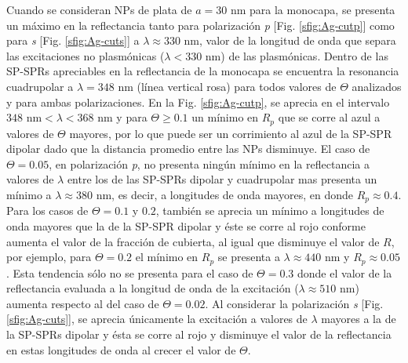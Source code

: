 Cuando se consideran NPs de plata de $a=30$ nm para la monocapa, se presenta un máximo en la reflectancia tanto para polarización \emph{p} [Fig. \ref{sfig:Ag-cutp}] como para \emph{s} [Fig. \ref{sfig:Ag-cuts}]  a $\lambda \approx 330$ nm, valor de la longitud de onda que separa las excitaciones no plasmónicas ($\lambda<330$ nm) de las plasmónicas. Dentro de las SP-SPRs apreciables en la reflectancia de la monocapa se encuentra la resonancia cuadrupolar a $\lambda = 348$ nm (línea vertical rosa) para todos valores de $\Theta$ analizados y para ambas polarizaciones. En la Fig. \ref{sfig:Ag-cutp}, se aprecia en el intervalo $348$ nm$<\lambda<368$ nm y para $\Theta\geq 0.1$ un mínimo en $R_p$ que se corre al azul a valores de $\Theta$ mayores, por lo que puede ser un corrimiento al azul de la SP-SPR dipolar dado que la distancia promedio entre las NPs disminuye. El caso de $\Theta =0.05$, en polarización \emph{p}, no presenta ningún mínimo en la reflectancia a valores de $\lambda$ entre los de las SP-SPRs dipolar y cuadrupolar mas presenta un mínimo a $\lambda\approx 380$ nm, es decir, a longitudes de onda mayores, en donde $R_p\approx 0.4$. Para los casos de $\Theta = 0.1$ y $0.2$, también se aprecia un mínimo a longitudes de onda mayores que la de la SP-SPR dipolar y éste se corre al rojo conforme aumenta el valor de la fracción de cubierta, al igual que disminuye el valor de $R$, por ejemplo, para  $\Theta = 0.2$ el mínimo en $R_p$ se presenta a $\lambda \approx 440$ nm y $R_p \approx 0.05$. Esta tendencia sólo no se presenta para el caso de $\Theta = 0.3$ donde el valor de la reflectancia evaluada a la longitud de onda de la excitación ($\lambda \approx 510$ nm) aumenta respecto al del caso de $\Theta = 0.02$. Al considerar la polarización \emph{s} [Fig. \ref{sfig:Ag-cuts}], se aprecia únicamente la excitación a valores de $\lambda$ mayores a la de la SP-SPRs dipolar y ésta se corre al rojo y disminuye el valor de la reflectancia en estas longitudes de onda al crecer el valor de $\Theta$.

